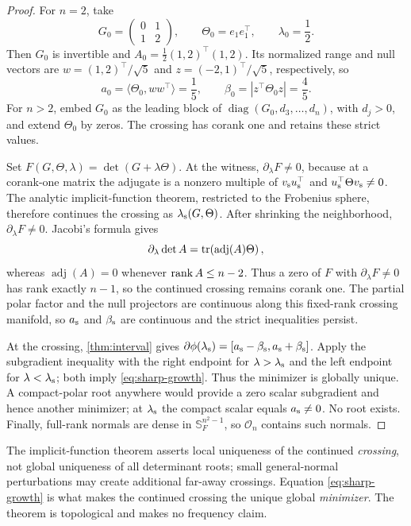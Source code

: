 \begin{proof}
For \(n=2\), take
\[
 G_0=\begin{pmatrix}0&1\\1&2\end{pmatrix},
 \qquad \Theta_0=e_1e_1^\top,
 \qquad \lambda_0=\frac12.
\]
Then \(G_0\) is invertible and
\(A_0=\tfrac12(1,2)^\top(1,2)\).  Its normalized range and null vectors are
\(w=(1,2)^\top/\sqrt5\) and \(z=(-2,1)^\top/\sqrt5\), respectively, so
\[
 a_0=\langle\Theta_0,ww^\top\rangle=\frac15,
 \qquad \beta_0=|z^\top\Theta_0z|=\frac45.
\]
For \(n>2\), embed \(G_0\) as the leading block of
\(\operatorname{diag}(G_0,d_3,\ldots,d_n)\), with \(d_j>0\), and extend
\(\Theta_0\) by zeros.  The crossing has corank one and retains these strict
values.

Set \(F(G,\Theta,\lambda)=\det(G+\lambda\Theta)\).  At the witness,
\(\partial_\lambda F\ne0\), because at a corank-one matrix the adjugate is a
nonzero multiple of \(v_{\rm s}u_{\rm s}^\top\) and
\(u_{\rm s}^\top\Theta v_{\rm s}\ne0\).  The analytic implicit-function
theorem, restricted to the Frobenius sphere, therefore continues the crossing
as \(\lambda_{\rm s}(G,\Theta)\).  After shrinking the neighborhood,
\(\partial_\lambda F\ne0\).  Jacobi's formula gives
\[
 \partial_\lambda\det A=\operatorname{tr}\!\left(\operatorname{adj}(A)\Theta\right),
\]
whereas \(\operatorname{adj}(A)=0\) whenever \(\operatorname{rank} A\le n-2\).
Thus a zero of \(F\) with \(\partial_\lambda F\ne0\) has rank exactly
\(n-1\), so the continued crossing remains corank one.  The
partial polar factor and the null projectors are continuous along this
fixed-rank crossing manifold, so \(a_{\rm s}\) and \(\beta_{\rm s}\) are
continuous and the strict inequalities persist.

At the crossing, \cref{thm:interval} gives
\(\partial\phi(\lambda_{\rm s})=[a_{\rm s}-\beta_{\rm s},
a_{\rm s}+\beta_{\rm s}]\).  Apply the subgradient inequality with the right
endpoint for \(\lambda>\lambda_{\rm s}\) and the left endpoint for
\(\lambda<\lambda_{\rm s}\); both imply \eqref{eq:sharp-growth}.  Thus the
minimizer is globally unique.  A compact-polar root anywhere would provide a
zero scalar subgradient and hence another minimizer; at \(\lambda_{\rm s}\)
the compact scalar equals \(a_{\rm s}\ne0\).  No root exists.  Finally,
full-rank normals are dense in \(\mathbb S_F^{n^2-1}\), so \(\mathcal O_n\)
contains such normals.
\end{proof}

The implicit-function theorem asserts local uniqueness of the continued
\emph{crossing}, not global uniqueness of all determinant roots; small
general-normal perturbations may create additional far-away crossings.
Equation \eqref{eq:sharp-growth} is what makes the continued crossing the
unique global \emph{minimizer}.  The theorem is topological and makes no
frequency claim.


